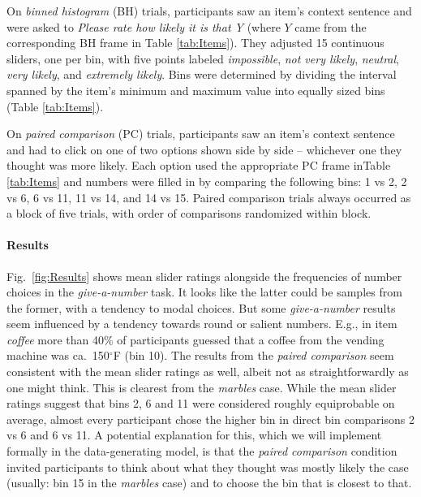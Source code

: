 \documentclass[10pt,letterpaper]{article}
\newcommand{\tableref}[1]{Table \ref{#1}}
\newcommand{\figref}[1]{Fig.~\ref{#1}}
\begin{document}
On \emph{binned histogram} (BH) trials, participants saw an item's context sentence and were
asked to \emph{Please rate how likely it is that Y} (where $Y$ came from the corresponding BH
frame in \tableref{tab:Items}). They adjusted 15 continuous sliders, one per bin, with five
points labeled \emph{impossible}, \emph{not very likely}, \emph{neutral}, \emph{very likely},
and \emph{extremely likely}. Bins were determined by dividing the interval spanned by
the item's minimum and maximum value into equally sized bins (\tableref{tab:Items}).



On \emph{paired comparison} (PC) trials, participants saw an item's context sentence and had to
click on one of two options shown side by side -- whichever one they thought was more likely.
Each option used the appropriate PC frame in\tableref{tab:Items} and numbers were filled in by
comparing the following bins: 1 vs 2, 2 vs 6, 6 vs 11, 11 vs 14, and 14 vs 15. Paired
comparison trials always occurred as a block of five trials, with order of comparisons
randomized within block.


\paragraph{Results} \figref{fig:Results} shows mean slider ratings alongside the frequencies of
number choices in the \emph{give-a-number} task. It looks like the latter could be samples from
the former, with a tendency to modal choices. But some \emph{give-a-number} results seem
influenced by a tendency towards round or salient numbers. E.g., in item \emph{coffee} more
than 40\% of participants guessed that a coffee from the vending machine was ca.~150$^{\circ}$F
(bin 10). The results from the \emph{paired comparison} seem consistent with the mean slider
ratings as well, albeit not as straightforwardly as one might think. This is clearest from the
\emph{marbles} case. While the mean slider ratings suggest that bins 2, 6 and 11 were
considered roughly equiprobable on average, almost every participant chose the higher bin in
direct bin comparisons 2 vs 6 and 6 vs 11. A potential explanation for this, which we will
implement formally in the data-generating model, is that the \emph{paired comparison} condition
invited participants to think about what they thought was mostly likely the case (usually: bin
15 in the \emph{marbles} case) and to choose the bin that is closest to that.
\end{document}
